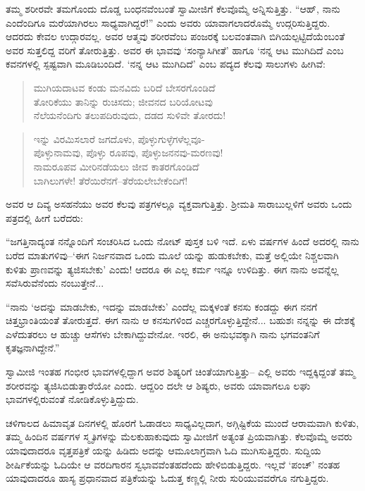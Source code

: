 ತಮ್ಮ ಶರೀರವೇ ತಮಗೊಂದು ದೊಡ್ಡ ಬಂಧನವೆಂಬಂತೆ ಸ್ವಾಮೀಜಿಗೆ ಕೆಲವೊಮ್ಮೆ ಅನ್ನಿಸುತ್ತಿತ್ತು. “ಆಹ್, ನಾನು ಎಂದೆಂದಿಗೂ ಮರೆಯಾಗಿರಲು ಸಾಧ್ಯವಾಗಿದ್ದರೆ!” ಎಂದು ಅವರು ಯಾವಾಗಲಾದರೊಮ್ಮೆ ಉದ್ಗರಿಸುತ್ತಿದ್ದರು. ಆದರದು ಕೇವಲ ಉದ್ಗಾರವಲ್ಲ. ಅವರ ಆತ್ಮವು ಶರೀರವೆಂಬ ಪಂಜರಕ್ಕೆ ಬಲವಂತವಾಗಿ ಬಿಗಿಯಲ್ಪಟ್ಟಿದೆಯೆಂಬಂತೆ ಅವರ ಸುತ್ತಲಿದ್ದ ವರಿಗೆ ತೋರುತ್ತಿತ್ತು. ಅವರ ಈ ಭಾವವು ‘ಸಂನ್ಯಾಸಿಗೀತೆ’ ಹಾಗೂ ‘ನನ್ನ ಆಟ ಮುಗಿದಿದೆ ಎಂಬ ಕವನಗಳಲ್ಲಿ ಸ್ಪಷ್ಟವಾಗಿ ಮೂಡಿಬಂದಿದೆ. ‘ನನ್ನ ಆಟ ಮುಗಿದಿದೆ’ ಎಂಬ ಪದ್ಯದ ಕೆಲವು ಸಾಲುಗಳು ಹೀಗಿವೆ:

\begin{verse}
ಮುಗಿಯದಾಟವ ಕಂಡು ಮನವಿದು ಬರಿದೆ ಬೇಸರಗೊಂಡಿದೆ\\ತೋರಿಕೆಯು ತಾನಿನ್ನು ರುಚಿಸದು; ಜೀವನದ ಬರಿಯೋಟವು\\ನೆಲೆಯನೆಂದಿಗು ತಲುಪದಿರುವುದು, ದಡದ ಸುಳಿವೇ ತೋರದು!
\end{verse}

\begin{verse}
ಇನ್ನು ವಿರಮಿಸಲಾರೆ ಜಗದೊಳು, ಪೊಳ್ಳುಗುಳ್ಳೆಗಳೆಲ್ಲವೂ-\\ಪೊಳ್ಳುನಾಮವು, ಪೊಳ್ಳು ರೂಪವು, ಪೊಳ್ಳುಜನನವು-ಮರಣವು!\\ನಾಮರೂಪವ ಮೀರಿನಡೆಯಲು ಜೀವ ಕಾತರಗೊಂಡಿದೆ\\ಬಾಗಿಲುಗಳೇ! ತೆರೆಯಿರೆನಗೆ–ತೆರೆಯಲೇಬೇಕೆಂದಿಗೆ!
\end{verse}

ಅವರ ಆ ದಿವ್ಯ ಅಸಹನೆಯು ಅವರ ಕೆಲವು ಪತ್ರಗಳಲ್ಲೂ ವ್ಯಕ್ತವಾಗುತ್ತಿತ್ತು. ಶ್ರೀಮತಿ ಸಾರಾಬುಲ್ಲಳಿಗೆ ಅವರು ಒಂದು ಪತ್ರದಲ್ಲಿ ಹೀಗೆ ಬರೆದರು:

“ಜಗತ್ತಿನಾದ್ಯಂತ ನನ್ನೊಂದಿಗೆ ಸಂಚರಿಸಿದ ಒಂದು ನೋಟ್ ಪುಸ್ತಕ ಬಳಿ ಇದೆ. ಏಳು ವರ್ಷಗಳ ಹಿಂದೆ ಅದರಲ್ಲಿ ನಾನು ಬರೆದ ಮಾತುಗಳಿವು–‘ಈಗ ನಿರ್ಜನವಾದ ಒಂದು ಮೂಲೆ ಯನ್ನು ಹುಡುಕಬೇಕು, ಮತ್ತೆ ಅಲ್ಲಿಯೇ ನಿಶ್ಚಲವಾಗಿ ಕುಳಿತು ಪ್ರಾಣವನ್ನು ತ್ಯಜಿಸಬೇಕು’ ಎಂದು! ಆದರೂ ಈ ಎಲ್ಲ ಕರ್ಮ ಇನ್ನೂ ಉಳಿದಿತ್ತು. ಈಗ ನಾನು ಅವನ್ನೆಲ್ಲ ಸವೆಸಿರುವೆನೆಂದು ನಂಬುತ್ತೇನೆ...

“ನಾನು ‘ಅದನ್ನು ಮಾಡಬೇಕು, ಇದನ್ನು ಮಾಡಬೇಕು’ ಎಂದೆಲ್ಲ ಮಕ್ಕಳಂತೆ ಕನಸು ಕಂಡದ್ದು ಈಗ ನನಗೆ ಚಿತ್ತಭ್ರಾಂತಿಯಂತೆ ತೋರುತ್ತದೆ. ಈಗ ನಾನು ಆ ಕನಸುಗಳಿಂದ ಎಚ್ಚರಗೊಳ್ಳುತ್ತಿದ್ದೇನೆ... ಬಹುಶಃ ನನ್ನನ್ನು ಈ ದೇಶಕ್ಕೆ ಎಳೆದುತರಲು ಆ ಹುಚ್ಚು ಆಸೆಗಳು ಬೇಕಾಗಿದ್ದುವೇನೋ. ಇರಲಿ, ಈ ಅನುಭವಕ್ಕಾಗಿ ನಾನು ಭಗವಂತನಿಗೆ ಕೃತಜ್ಞನಾಗಿದ್ದೇನೆ.”

ಸ್ವಾಮೀಜಿ ಇಂತಹ ಗಂಭೀರ ಭಾವಗಳಲ್ಲಿದ್ದಾಗ ಅವರ ಶಿಷ್ಯರಿಗೆ ಚಿಂತೆಯಾಗುತ್ತಿತ್ತು– ಎಲ್ಲಿ ಅವರು ಇದ್ದಕ್ಕಿದ್ದಂತೆ ತಮ್ಮ ಶರೀರವನ್ನು ತ್ಯಜಿಸಿಬಿಡುತ್ತಾರೆಯೋ ಎಂದು. ಆದ್ದರಿಂ ದಲೇ ಆ ಶಿಷ್ಯರು, ಅವರು ಯಾವಾಗಲೂ ಲಘು ಭಾವಗಳಲ್ಲಿರುವಂತೆ ನೋಡಿಕೊಳ್ಳುತ್ತಿದ್ದುದು.

ಚಳಿಗಾಲದ ಹಿಮಾವೃತ ದಿನಗಳಲ್ಲಿ ಹೊರಗೆ ಓಡಾಡಲು ಸಾಧ್ಯವಿಲ್ಲದಾಗ, ಅಗ್ಗಿಷ್ಟಿಕೆಯ ಮುಂದೆ ಆರಾಮವಾಗಿ ಕುಳಿತು, ತಮ್ಮ ಹಿಂದಿನ ವರ್ಷಗಳ ಸ್ಮೃತಿಗಳನ್ನು ಮೆಲಕುಹಾಕುವುದು ಸ್ವಾಮೀಜಿಗೆ ಅತ್ಯಂತ ಪ್ರಿಯವಾಗಿತ್ತು. ಕೆಲವೊಮ್ಮೆ ಅವರು ಯಾವುದಾದರೂ ವೃತ್ತಪತ್ರಿಕೆ ಯನ್ನು ಹಿಡಿದು ಅದನ್ನು ಆಮೂಲಾಗ್ರವಾಗಿ ಓದಿ ಮುಗಿಸುತ್ತಿದ್ದರು. ಸುದ್ದಿಯ ಶೀರ್ಷಿಕೆಯನ್ನು ಓದಿಯೇ ಆ ವರದಿಗಾರನ ಸ್ವಭಾವವೆಂತಹದೆಂದು ಹೇಳಿಬಿಡುತ್ತಿದ್ದರು. ಇಲ್ಲವೆ ‘ಪಂಚ್​’ ನಂತಹ ಯಾವುದಾದರೂ ಹಾಸ್ಯ ಪ್ರಧಾನವಾದ ಪತ್ರಿಕೆಯನ್ನು ಓದುತ್ತ ಕಣ್ಣಲ್ಲಿ ನೀರು ಸುರಿಯುವವರೆಗೂ ನಗುತ್ತಿದ್ದರು.

